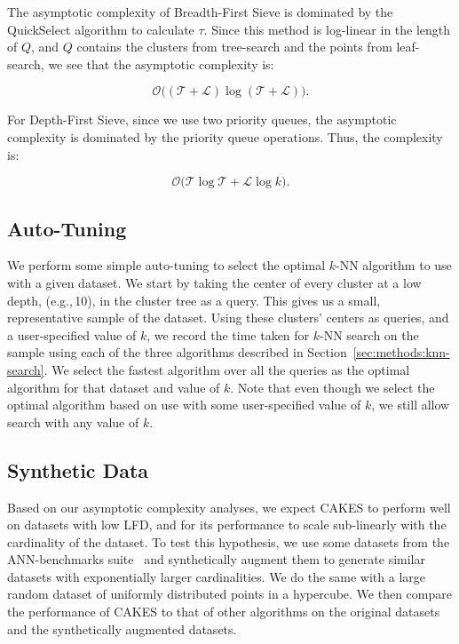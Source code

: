 The asymptotic complexity of Breadth-First Sieve is dominated by the QuickSelect algorithm to calculate $\tau$.
Since this method is log-linear in the length of $Q$, and $Q$ contains the clusters from tree-search and the points from leaf-search, we see that the asymptotic complexity is:

\begin{equation}
    \mathcal{O} \Big( ( \mathcal{T} + \mathcal{L} ) \log ( \mathcal{T} + \mathcal{L} ) \Big).
    \label{eq:methods:breadth-first-sieve-complexity}
\end{equation}

For Depth-First Sieve, since we use two priority queues, the asymptotic complexity is dominated by the priority queue operations.
Thus, the complexity is:

\begin{equation}
    \mathcal{O} \Big( \mathcal{T} \log \mathcal{T} + \mathcal{L} \log k \Big).
    \label{eq:methods:depth-first-sieve-complexity}
\end{equation}


\subsection{Auto-Tuning}
\label{sec:methods:auto-tuning}

We perform some simple auto-tuning to select the optimal $k$-NN algorithm to use with a given dataset.
We start by taking the center of every cluster at a low depth, (e.g.,\,10), in the cluster tree as a query.
This gives us a small, representative sample of the dataset.
Using these clusters' centers as queries, and a user-specified value of $k$, we record the time taken for $k$-NN search on the sample using each of the three algorithms described in Section~\ref{sec:methods:knn-search}.
We select the fastest algorithm over all the queries as the optimal algorithm for that dataset and value of $k$.
Note that even though we select the optimal algorithm based on use with some user-specified value of $k$, we still allow search with any value of $k$.


\subsection{Synthetic Data}
\label{sec:methods:synthetic-data}

Based on our asymptotic complexity analyses, we expect CAKES to perform well on datasets with low LFD, and for its performance to scale sub-linearly with the cardinality of the dataset.
To test this hypothesis, we use some datasets from the ANN-benchmarks suite~\cite{aumuller2020ann} and synthetically augment them to generate similar datasets with exponentially larger cardinalities.
We do the same with a large random dataset of uniformly distributed points in a hypercube.
We then compare the performance of CAKES to that of other algorithms on the original datasets and the synthetically augmented datasets.

